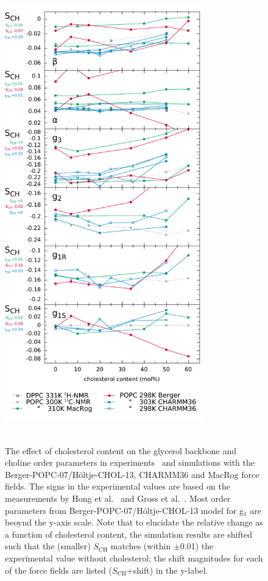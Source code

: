 \documentclass[journal=jacsat,manuscript=article]{achemso}
\begin{document}
\begin{figure}[]
  \centering
  \includegraphics[width=8.6cm]{../DATAreportediINblog/cholesterolization.pdf} \\
   \\
  \caption{\label{ordPchol}
    The effect of cholesterol content on the glycerol backbone and choline order parameters in experiments~\cite{brown78,ferreira13} and simulations
    with the Berger-POPC-07/H\"oltje-CHOL-13, CHARMM36 and MacRog force fields. The signs in the experimental values are based on the measurements by Hong et al.~\cite{hong95a,hong95b} 
    and Gross et al.~\cite{gross97}.  Most order parameters from Berger-POPC-07/H\"oltje-CHOL-13 model for g$_1$ are beoynd the y-axis scale.
    Note that to elucidate the relative change as a function of cholesterol content,
    the simulation results are shifted such that the (smaller) $S_\mathrm{CH}$
    matches (within $\pm$0.01) the experimental value without cholesterol;
    the shift magnitudes for each of the force fields are listed ($S_\mathrm{CH}$+shift) in the y-label.
}
\end{figure}
\end{document}
